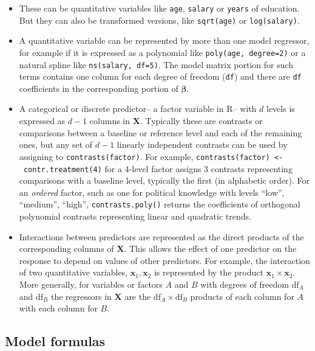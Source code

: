 \documentclass[
  letterpaper,
  10pt,
  krantz2]{krantz}
\begin{document}
{\begin{itemize}
\item
  These can be quantitative variables like \texttt{age}, \texttt{salary}
  or \texttt{years} of education. But they can also be transformed
  versions, like \texttt{sqrt(age)} or \texttt{log(salary)}.
\item
  A quantitative variable can be represented by more than one model
  regressor, for example if it is expressed as a polynomial like
  \texttt{poly(age,\ degree=2)} or a natural spline like
  \texttt{ns(salary,\ df=5)}. The model matrix portion for such terms
  contains one column for each degree of freedom (\texttt{df}) and there
  are \texttt{df} coefficients in the corresponding portion of
  \(\boldsymbol{\beta}\).
\item
  A categorical or discrete predictor-- a factor variable in R-- with
  \(d\) levels is expressed as \(d - 1\) columns in \(\mathbf{X}\).
  Typically these are contrasts or comparisons between a baseline or
  reference level and each of the remaining ones, but any set of
  \(d - 1\) linearly independent contrasts can be used by assigning to
  \texttt{contrasts(factor)}. For example,
  \texttt{contrasts(factor)\ \textless{}-\ contr.treatment(4)} for a
  4-level factor assigns 3 contrasts representing comparisons with a
  baseline level, typically the first (in alphabetic order). For an
  \emph{ordered} factor, such as one for political knowledge with levels
  ``low'', ``medium'', ``high'', \texttt{contrasts.poly()} returns the
  coefficients of orthogonal polynomial contrasts representing linear
  and quadratic trends.
\item
  Interactions between predictors are represented as the direct products
  of the corresponding columns of \(\mathbf{X}\). This allows the effect
  of one predictor on the response to depend on values of other
  predictors. For example, the interaction of two quantitative
  variables, \(\mathbf{x}_1, \mathbf{x}_2\) is represented by the
  product \(\mathbf{x}_1 \times \mathbf{x}_2\). More generally, for
  variables or factors \(A\) and \(B\) with degrees of freedom
  \(\text{df}_A\) and \(\text{df}_B\) the regressors in \(\mathbf{X}\)
  are the \(\text{df}_A \times \text{df}_B\) products of each column for
  \(A\) with each column for \(B\).
\end{itemize}

\subsection{Model formulas}\label{model-formulas}

}
\end{document}
